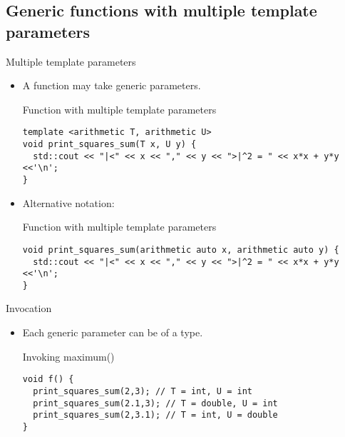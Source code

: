 \subsection{Generic functions with multiple template parameters}

\begin{frame}[t,fragile]{Multiple template parameters}
\begin{itemize}
  \item A function may take  generic parameters.

\begin{block}{Function with multiple template parameters}
\begin{lstlisting}
template <arithmetic T, arithmetic U>
void print_squares_sum(T x, U y) {
  std::cout << "|<" << x << "," << y << ">|^2 = " << x*x + y*y <<'\n';
}
\end{lstlisting}
\end{block}

  \item Alternative notation:

\begin{block}{Function with multiple template parameters}
\begin{lstlisting}
void print_squares_sum(arithmetic auto x, arithmetic auto y) {
  std::cout << "|<" << x << "," << y << ">|^2 = " << x*x + y*y <<'\n';
}
\end{lstlisting}
\end{block}

\end{itemize}
\end{frame}

\begin{frame}[t,fragile]{Invocation}
\begin{itemize}
  \item Each generic parameter can be of a  type.

\begin{block}{Invoking maximum()}
\begin{lstlisting}
void f() {
  print_squares_sum(2,3); // T = int, U = int
  print_squares_sum(2.1,3); // T = double, U = int
  print_squares_sum(2,3.1); // T = int, U = double
}
\end{lstlisting}
\end{block}

\end{itemize}
\end{frame}
